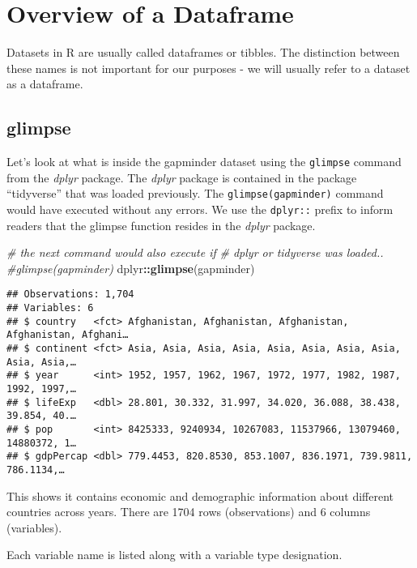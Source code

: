 \documentclass[]{book}
\newenvironment{Shaded}{\begin{snugshade}}{\end{snugshade}}
\newcommand{\KeywordTok}[1]{\textcolor[rgb]{0.13,0.29,0.53}{\textbf{#1}}}
\newcommand{\CommentTok}[1]{\textcolor[rgb]{0.56,0.35,0.01}{\textit{#1}}}
\newcommand{\OperatorTok}[1]{\textcolor[rgb]{0.81,0.36,0.00}{\textbf{#1}}}
\newcommand{\NormalTok}[1]{#1}
\begin{document}
\chapter{Overview of a Dataframe}\label{OverviewDataframe}

Datasets in R are usually called dataframes or tibbles. The distinction
between these names is not important for our purposes - we will usually
refer to a dataset as a dataframe.

\section{glimpse}\label{glimpse}

Let's look at what is inside the gapminder dataset using the
\texttt{glimpse} command from the \emph{dplyr} package. The \emph{dplyr}
package is contained in the package ``tidyverse'' that was loaded
previously. The \texttt{glimpse(gapminder)} command would have executed
without any errors. We use the \texttt{dplyr::} prefix to inform readers
that the glimpse function resides in the \emph{dplyr} package.

\begin{Shaded}
\begin{Highlighting}[]
\CommentTok{# the next command would also execute if}
\CommentTok{# dplyr or tidyverse was loaded..}
\CommentTok{#glimpse(gapminder)}
\NormalTok{dplyr}\OperatorTok{::}\KeywordTok{glimpse}\NormalTok{(gapminder)}
\end{Highlighting}
\end{Shaded}

\begin{verbatim}
## Observations: 1,704
## Variables: 6
## $ country   <fct> Afghanistan, Afghanistan, Afghanistan, Afghanistan, Afghani…
## $ continent <fct> Asia, Asia, Asia, Asia, Asia, Asia, Asia, Asia, Asia, Asia,…
## $ year      <int> 1952, 1957, 1962, 1967, 1972, 1977, 1982, 1987, 1992, 1997,…
## $ lifeExp   <dbl> 28.801, 30.332, 31.997, 34.020, 36.088, 38.438, 39.854, 40.…
## $ pop       <int> 8425333, 9240934, 10267083, 11537966, 13079460, 14880372, 1…
## $ gdpPercap <dbl> 779.4453, 820.8530, 853.1007, 836.1971, 739.9811, 786.1134,…
\end{verbatim}

This shows it contains economic and demographic information about
different countries across years. There are 1704 rows (observations) and
6 columns (variables).

Each variable name is listed along with a variable type designation.
\end{document}
